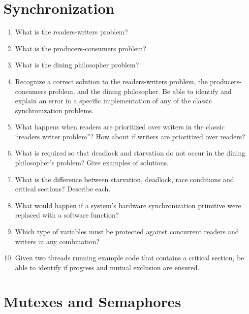 \documentclass[11pt]{article}
\begin{document}
\section{Synchronization}
\label{sec-12}

\begin{enumerate}
\item What is the readers-writers problem?
\item What is the producers-consumers problem?
\item What is the dining philosopher problem?
\item Recognize a correct solution to the readers-writers problem, the
    producers-consumers problem, and the dining philosopher. Be able
    to identify and explain an error in a specific implementation of any of the classic synchronization problems.
\item What happens when readers are prioritized over writers in the
      classic “readers writer problem”? How about if writers are prioritized over readers?
\item What is required so that deadlock and starvation do not occur in
      the dining philosopher’s problem? Give examples of solutions.
\item What is the difference between starvation, deadlock, race
      conditions and critical sections? Describe each.
\item What would happen if a system’s hardware synchronization primitive were replaced with a software function?
\item Which type of variables must be protected against concurrent
    readers and writers in any combination?
\item Given two threads running example code that contains a critical
     section, be able to identify if progress and mutual exclusion are ensured.
\end{enumerate}
\section{Mutexes and Semaphores}
\label{sec-13}
\end{document}
